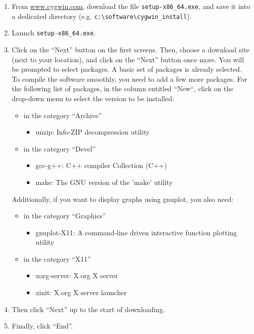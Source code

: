 \documentclass[a4paper, 11pt]{article}
\begin{document}
\begin{enumerate}
\item From \url{www.cygwin.com}, download the file \verb!setup-x86_64.exe!, and save it into a dedicated directory (e.g. \verb!c:\software\cygwin_install!).
\item Launch \verb!setup-x86_64.exe!.
\item Click on the ``Next'' button on the first screens. Then, choose a download site (next to your location), and click on the ``Next'' button once more. You will be prompted to select packages. A basic set of packages is already selected. To compile the software smoothly, you need to add a few more packages. For the following list of packages, in the column entitled ``New``, click on the drop-down menu to select the version to be installed:
	\begin{itemize}
	\item in the category ``Archive''
		\begin{itemize}
		\item unzip: Info-ZIP decompression utility
		\end{itemize}
	\item in the category ``Devel''
		\begin{itemize}
		\item gcc-g++: C++ compiler Collection (C++)
		\item make: The GNU version of the 'make' utility
		\end{itemize}
	\end{itemize}
Additionally, if you want to display graphs using gnuplot, you also need:
	\begin{itemize}
	\item in the category ``Graphics''
		\begin{itemize}
		\item gnuplot-X11: A command-line driven interactive function plotting utility
		\end{itemize}
	\item in the category ``X11''
		\begin{itemize}
		\item xorg-server: X.org X server
		\item xinit: X.org X server launcher
		\end{itemize}
	\end{itemize}
\item Then click ``Next'' up to the start of downloading.
\item Finally, click ``End''.
\end{enumerate}
\end{document}
